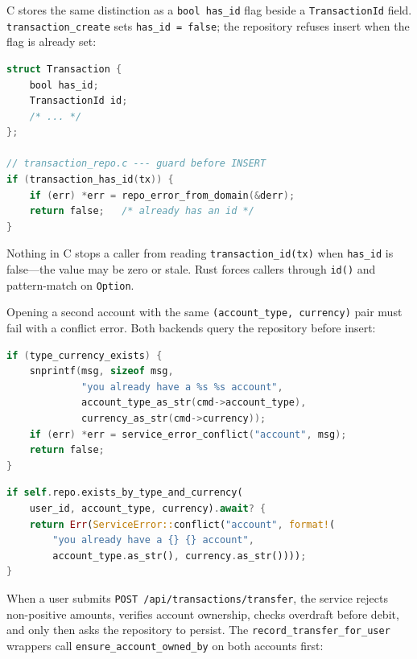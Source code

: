 C stores the same distinction as a \texttt{bool has\_id} flag beside a
\texttt{TransactionId} field. \texttt{transaction\_create} sets \texttt{has\_id = false};
the repository refuses insert when the flag is already set:

\begin{lstlisting}[language=C, caption={transaction.c / transaction\_repo.c ---
C uses a flag; Rust uses \texttt{Option}. Both reject double-insert.}]
struct Transaction {
    bool has_id;
    TransactionId id;
    /* ... */
};

// transaction_repo.c --- guard before INSERT
if (transaction_has_id(tx)) {
    if (err) *err = repo_error_from_domain(&derr);
    return false;   /* already has an id */
}
\end{lstlisting}

Nothing in C stops a caller from reading \texttt{transaction\_id(tx)} when
\texttt{has\_id} is false---the value may be zero or stale. Rust forces callers through
\texttt{id()} and pattern-match on \texttt{Option}.

Opening a second account with the same \texttt{(account\_type, currency)} pair must fail
with a conflict error. Both backends query the repository before insert:

\begin{lstlisting}[language=C, caption={account\_service.c --- Duplicate
(type, currency) rejected before domain \texttt{Account} is built.}]
if (type_currency_exists) {
    snprintf(msg, sizeof msg,
             "you already have a %s %s account",
             account_type_as_str(cmd->account_type),
             currency_as_str(cmd->currency));
    if (err) *err = service_error_conflict("account", msg);
    return false;
}
\end{lstlisting}

\begin{lstlisting}[language=Rust, caption={account.rs (service) --- Same rule via
\texttt{ServiceError::Conflict}.}]
if self.repo.exists_by_type_and_currency(
    user_id, account_type, currency).await? {
    return Err(ServiceError::conflict("account", format!(
        "you already have a {} {} account",
        account_type.as_str(), currency.as_str())));
}
\end{lstlisting}

When a user submits \texttt{POST /api/transactions/transfer}, the service rejects
non-positive amounts, verifies account ownership, checks overdraft before debit, and only
then asks the repository to persist. The \texttt{record\_transfer\_for\_user} wrappers
call \texttt{ensure\_account\_owned\_by} on both accounts first:

